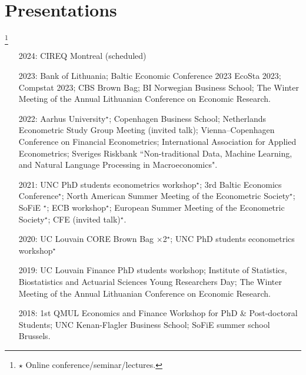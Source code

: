 \documentclass[10pt]{article}
\newcommand\blfootnote[1]{%
	\begingroup
	\renewcommand\thefootnote{}\footnote{#1}%
	\addtocounter{footnote}{-1}%
	\endgroup
}
\newcommand{\thestar}{{\Large{\color{blue}\ensuremath{\star}} }}
\newcommand{\thestarnogap}{{\Large{\color{blue}\ensuremath{^\star}}}}
\begin{document}
	\smallskip

	
	
%	
%	
%	
	
	\section*{Presentations}
	\vspace{-2.5em}
	
	\blfootnote{\thestar Online conference/seminar/lectures.} 
	\begin{itemize}[leftmargin=4.5em]
		\setlength\itemsep{-0.1em}
		\item[2024:] CIREQ Montreal (scheduled) 
		\item[2023:] Bank of Lithuania; Baltic Economic Conference 2023 EcoSta 2023; Compstat 2023; CBS Brown Bag; BI Norwegian Business School; The Winter Meeting of the Annual Lithuanian Conference on Economic Research.
		\item[2022:] Aarhus University\thestarnogap; Copenhagen Business School; Netherlands Econometric Study Group Meeting (invited talk); Vienna–Copenhagen Conference on Financial Econometrics; International Association for Applied Econometrics; Sveriges Riskbank ``Non-traditional Data, Machine Learning, and Natural Language Processing in Macroeconomics".
		\item[2021:] UNC PhD students econometrics workshop\thestarnogap; 3rd Baltic Economics Conference\thestarnogap; North American Summer Meeting of the Econometric Society\thestarnogap; SoFiE \thestarnogap; ECB workshop\thestarnogap; European Summer Meeting of the Econometric Society\thestarnogap; CFE (invited talk)\thestarnogap.
		\item[2020:] UC Louvain CORE Brown Bag $\times$2\thestarnogap; UNC PhD students econometrics workshop\thestarnogap
		\item[2019:] UC Louvain Finance PhD students workshop; Institute of Statistics, Biostatistics and Actuarial Sciences Young Researchers Day; The Winter Meeting of the Annual Lithuanian Conference on Economic Research.
		\item[2018:] 1st QMUL Economics and Finance Workshop for PhD \& Post-doctoral Students; UNC Kenan-Flagler Business School; SoFiE summer school Brussels.
	\end{itemize}
\end{document}
